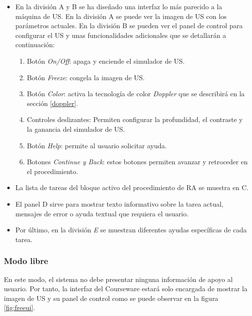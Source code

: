 \begin{itemize}
    \item En la división A y B se ha diseñado una interfaz lo más parecido a la máquina de \ac{US}.%
     En la división A se puede ver la imagen de \ac{US} con los parámetros actuales. En la división B se pueden ver el panel de control para configurar el \ac{US} y unas funcionalidades adicionales que se detallarán a continuación:
    \begin{enumerate}
        
        \item Botón \emph{On/Off}: apaga y enciende el simulador de \ac{US}.
        \item Botón \emph{Freeze}: congela la imagen de \ac{US}.
 \item Botón \emph{Color}: activa la tecnología de color \emph{Doppler} que se describirá en la sección \ref{doppler}.
\item Controles deslizantes: Permiten configurar la profundidad, el contraste y la ganancia del simulador de \ac{US}.
        \item Botón \emph{Help}: permite al usuario solicitar ayuda.
        \item Botones \emph{Continue y Back}: estos botones permiten avanzar y retroceder en el procedimiento. 
    \end{enumerate}
    \item La lista de tareas del bloque activo del procedimiento de \ac{RA} se muestra en C.
    \item El panel D sirve para mostrar texto informativo sobre la tarea actual, mensajes de error o ayuda textual que requiera el usuario.
    \item Por último, en la división \emph{E} se muestran diferentes ayudas específicas de cada tarea.
\end{itemize}





\subsubsection{Modo libre}

En este modo, el sistema no debe presentar ninguna información de apoyo al usuario. Por tanto, la interfaz del \ac{Courseware} estará solo encargada de mostrar la imagen de \ac{US} y su panel de control como se puede observar en la figura \ref{fig:freeui}.

